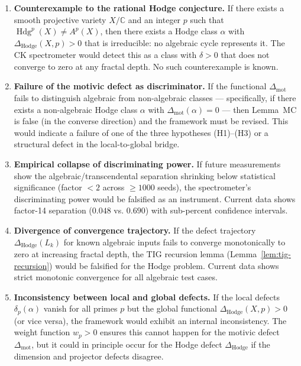 \documentclass[11pt]{article}
\theoremstyle{definition}
\DeclareMathOperator{\Hdg}{Hdg}
\begin{document}
\begin{enumerate}[label=\textbf{F\arabic*.}]
  \item \textbf{Counterexample to the rational Hodge conjecture.}
    If there exists a smooth projective variety $X/\mathbb{C}$ and an
    integer $p$ such that $\Hdg^p(X) \neq A^p(X)$, then there exists
    a Hodge class $\alpha$ with $\Delta_{\mathrm{Hodge}}(X, p) > 0$
    that is irreducible: no algebraic cycle represents it.  The CK
    spectrometer would detect this as a class with $\delta > 0$ that
    does not converge to zero at any fractal depth.  No such
    counterexample is known.

  \item \textbf{Failure of the motivic defect as discriminator.}
    If the functional $\Delta_{\mathrm{mot}}$ fails to distinguish
    algebraic from non-algebraic classes --- specifically, if there
    exists a non-algebraic Hodge class $\alpha$ with
    $\Delta_{\mathrm{mot}}(\alpha) = 0$ --- then Lemma~MC is false
    (in the converse direction) and the framework must be revised.
    This would indicate a failure of one of the three hypotheses
    (H1)--(H3) or a structural defect in the local-to-global bridge.

  \item \textbf{Empirical collapse of discriminating power.}
    If future measurements show the algebraic/transcendental separation
    shrinking below statistical significance (factor $< 2$ across
    $\geq 1000$ seeds), the spectrometer's discriminating power would be
    falsified as an instrument.  Current data shows factor-14 separation
    ($0.048$ vs. $0.690$) with sub-percent confidence intervals.

  \item \textbf{Divergence of convergence trajectory.}
    If the defect trajectory $\Delta_{\mathrm{Hodge}}(L_k)$ for known
    algebraic inputs fails to converge monotonically to zero at
    increasing fractal depth, the TIG recursion lemma
    (Lemma~\ref{lem:tig-recursion}) would be falsified for the Hodge
    problem.  Current data shows strict monotonic convergence for all
    algebraic test cases.

  \item \textbf{Inconsistency between local and global defects.}
    If the local defects $\delta_p(\alpha)$ vanish for all primes $p$
    but the global functional $\Delta_{\mathrm{Hodge}}(X, p) > 0$
    (or vice versa), the framework would exhibit an internal
    inconsistency.  The weight function $w_p > 0$ ensures this cannot
    happen for the motivic defect $\Delta_{\mathrm{mot}}$, but it could
    in principle occur for the Hodge defect $\Delta_{\mathrm{Hodge}}$ if
    the dimension and projector defects disagree.
\end{enumerate}
\end{document}
